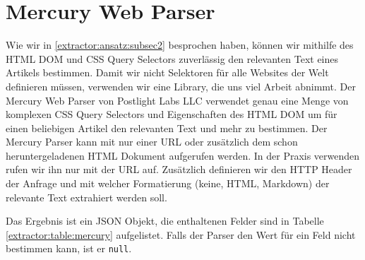 \section{Mercury Web Parser}
Wie wir in \autoref{extractor:ansatz:subsec2} besprochen haben, können wir mithilfe des \ac{HTML DOM} und CSS Query Selectors zuverlässig den relevanten Text  eines Artikels bestimmen. Damit wir nicht Selektoren für alle Websites der Welt definieren müssen, verwenden wir eine Library, die uns viel Arbeit abnimmt. Der Mercury Web Parser von Postlight Labs LLC\cite{mercury_homepage} verwendet genau eine Menge von komplexen CSS Query Selectors und Eigenschaften des HTML DOM um für einen beliebigen Artikel den relevanten Text und mehr zu bestimmen. Der Mercury Parser kann mit nur einer URL oder zusätzlich dem schon heruntergeladenen HTML Dokument aufgerufen werden. In der Praxis verwenden rufen wir ihn nur mit der URL auf. Zusätzlich definieren wir den HTTP Header der Anfrage und mit welcher Formatierung (keine, HTML, Markdown) der relevante Text extrahiert werden soll.

Das Ergebnis ist ein \ac{JSON} Objekt, die enthaltenen Felder sind in Tabelle \ref{extractor:table:mercury} aufgelistet. Falls der Parser den Wert für ein Feld nicht bestimmen kann, ist er \verb|null|.

